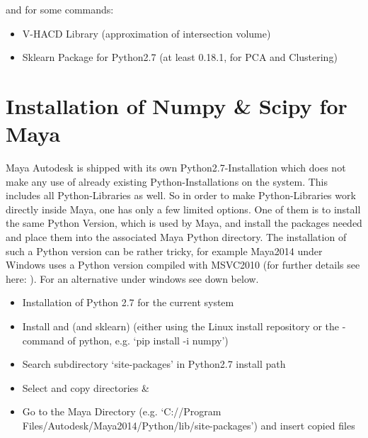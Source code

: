 \documentclass[letterpaper,10pt,english]{sphinxmanual}
\begin{document}
and for some commands:
\begin{itemize}
\item {} 
V-HACD Library (approximation of intersection volume)

\item {} 
Sklearn Package for Python2.7 (at least 0.18.1, for PCA and Clustering)

\end{itemize}


\section{Installation of Numpy \& Scipy for Maya}
\label{\detokenize{index:installation-of-numpy-scipy-for-maya}}
Maya Autodesk is shipped with its own Python2.7-Installation which does not make any use of already existing Python-Installations on the system. This includes all Python-Libraries as well. So in order to make Python-Libraries work directly inside Maya, one has only a few limited options. One of them is to install the same Python Version, which is used by Maya, and install the packages needed and place them into the associated Maya Python directory. The installation of such a Python version can be rather tricky, for example Maya2014 under Windows uses a Python version compiled with MSVC2010 (for further details see here: ). For an alternative under windows see down below.
\begin{itemize}
\item {} 
Installation of Python 2.7 for the current system

\item {} 
Install  and  (and sklearn) (either using the Linux install repository or the -command of python, e.g. ‘pip install -i  numpy’)

\item {} 
Search subdirectory ‘site-packages’ in Python2.7 install path

\item {} 
Select and copy directories  \& 

\item {} 
Go to the Maya Directory (e.g. ‘C://Program Files/Autodesk/Maya2014/Python/lib/site-packages’) and insert copied files

\end{itemize}
\end{document}
